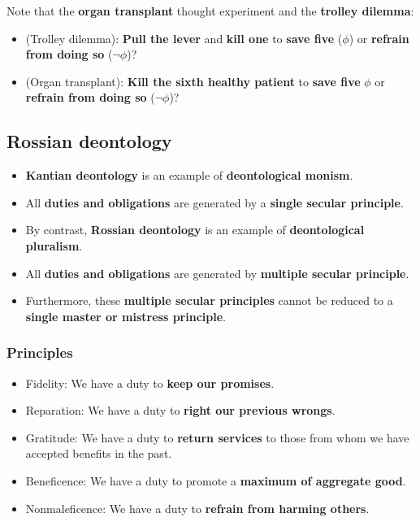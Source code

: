 \documentclass[11pt]{article}
\begin{document}
Note that the \textbf{organ transplant} thought experiment and the \textbf{trolley dilemma}:
\begin{itemize}
\item (Trolley dilemma): \textbf{Pull the lever} and \textbf{kill one} to \textbf{save five} (\(\phi\)) or \textbf{refrain from doing so} (\(\neg \phi\))?
\item (Organ transplant): \textbf{Kill the sixth healthy patient} to \textbf{save five} \(\phi\) or \textbf{refrain from doing so} (\(\neg \phi\))?
\end{itemize}
\subsection{Rossian deontology}
\label{sec:orgdb930b1}
\begin{itemize}
\item \textbf{Kantian deontology} is an example of \textbf{deontological monism}.
\item All \textbf{duties and obligations} are generated by a \textbf{single secular principle}.
\item By contrast, \textbf{Rossian deontology} is an example of \textbf{deontological pluralism}.
\item All \textbf{duties and obligations} are generated by \textbf{multiple secular principle}.
\item Furthermore, these \textbf{multiple secular principles} cannot be reduced to a \textbf{single master or mistress principle}.
\end{itemize}
\subsubsection{Principles}
\label{sec:org97391b1}
\begin{itemize}
\item Fidelity:
We have a duty to \textbf{keep our promises}.
\item Reparation:
We have a duty to \textbf{right our previous wrongs}.
\item Gratitude:
We have a duty to \textbf{return services} to those from whom we have accepted benefits in the past.
\item Beneficence:
We have a duty to promote a \textbf{maximum of aggregate good}.
\item Nonmaleficence:
We have a duty to \textbf{refrain from harming others}.
\end{itemize}

 \newpage
\end{document}
